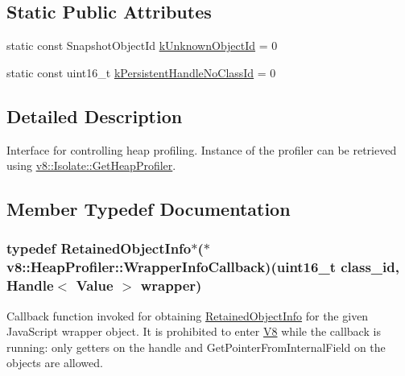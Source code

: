 \subsection*{Static Public Attributes}
\begin{DoxyCompactItemize}
\item 
static const Snapshot\-Object\-Id \hyperlink{classv8_1_1HeapProfiler_abf2b9d8facb18473f9b124ab8baf5786}{k\-Unknown\-Object\-Id} = 0
\item 
static const uint16\-\_\-t \hyperlink{classv8_1_1HeapProfiler_a272c9af3ea5cd90a2737af3d22a7eb78}{k\-Persistent\-Handle\-No\-Class\-Id} = 0
\end{DoxyCompactItemize}


\subsection{Detailed Description}
Interface for controlling heap profiling. Instance of the profiler can be retrieved using \hyperlink{classv8_1_1Isolate_a9c48259615e8370f6f0efd27cd7f99a6}{v8\-::\-Isolate\-::\-Get\-Heap\-Profiler}. 

\subsection{Member Typedef Documentation}
\hypertarget{classv8_1_1HeapProfiler_a588ccdcc02823c20cbb6f3ca58944684}{
\subsubsection[{Wrapper\-Info\-Callback}]{\setlength{\rightskip}{0pt plus 5cm}typedef {\bf Retained\-Object\-Info}$\ast$($\ast$ v8\-::\-Heap\-Profiler\-::\-Wrapper\-Info\-Callback)(uint16\-\_\-t class\-\_\-id, {\bf Handle}$<$ {\bf Value} $>$ wrapper)}}\label{classv8_1_1HeapProfiler_a588ccdcc02823c20cbb6f3ca58944684}
Callback function invoked for obtaining \hyperlink{classv8_1_1RetainedObjectInfo}{Retained\-Object\-Info} for the given Java\-Script wrapper object. It is prohibited to enter \hyperlink{classv8_1_1V8}{V8} while the callback is running\-: only getters on the handle and Get\-Pointer\-From\-Internal\-Field on the objects are allowed. 

